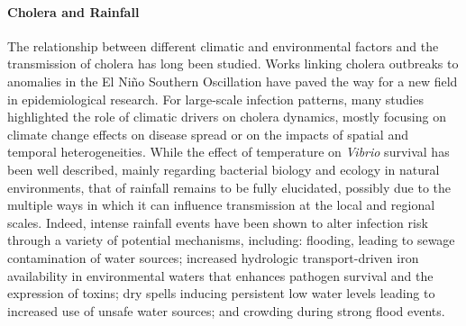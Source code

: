 \paragraph{Cholera and Rainfall} The relationship between different climatic and environmental factors and the transmission of cholera  has long been studied. Works linking cholera outbreaks to anomalies in the El Niño Southern Oscillation\cite{Colwell:GlobalClimateInfectious:1996, Pascual:CholeraDynamicsNinoSouthern:2000, Hashizume:DifferentialEffectIndian:2013}  have paved the way for a new field in epidemiological research. For large-scale infection patterns, many studies highlighted the role of climatic drivers on cholera dynamics, mostly focusing on climate change effects on disease spread\cite{Rinaldo:ModelingKeyDrivers:2017,Hashizume:EffectRainfallIncidence:2008,Magny:CholeraOutbreakSenegal:2012,Rodo:ClimateChangeInfectious:2013,Ramirez:NinoClimateCholera:2016,Vezzulli:ClimateInfluenceVibrio:2016, Rinaldo:ModelingKeyDrivers:2017} or on the impacts of spatial and temporal heterogeneities\cite{Reiner:HighlyLocalizedSensitivity:2012, Baker-Austin:EmergingVibrioRisk:2013, Vezzulli:OceanWarmingSpread:2013, Cash:CholeraShigellosisDifferent:2014,Escobar:GlobalMapSuitability:2015, Vezzulli:EffectsGlobalWarming:2015,Perez-Saez:ClimatedrivenEndemicCholera:2017}. While the effect of temperature on \textit{Vibrio} survival has been well described, mainly regarding bacterial biology and ecology in natural environments, that of rainfall remains to be fully elucidated, possibly due to the multiple ways in which it can influence transmission at the local and regional scales\cite{Rinaldo:Reassessment20102011:2012,Eisenberg:ExaminingRainfallCholera:2013,Baracchini:SeasonalityCholeraDynamics:2017}. Indeed, intense rainfall events have been shown to alter infection risk through a variety of potential mechanisms, including: flooding, leading to sewage contamination of water sources\cite{Ruiz-Moreno:CholeraSeasonalityMadras:2007, Hashizume:EffectRainfallIncidence:2008}; increased hydrologic transport-driven iron availability in environmental waters that enhances pathogen survival and the expression of toxins\cite{Lipp:EffectsGlobalClimate:2002,Faruque:SeasonalEpidemicsCholera:2005, Hill:ToxigenicVibrioCholerae:2011}; dry spells inducing persistent low water levels leading to increased use of unsafe water sources\cite{Rebaudet:EnvironmentalDeterminantsCholera:2013}; and crowding during strong flood events\cite{Reiner:HighlyLocalizedSensitivity:2012}.

